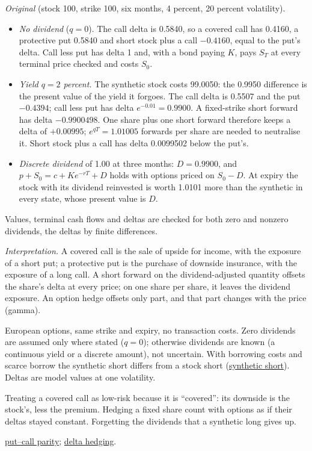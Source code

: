 \begin{qfmethod}
 \emph{Original} (stock 100, strike 100, six months, 4 percent, 20 percent volatility).
\begin{itemize}
\item \emph{No dividend} ($q=0$). The call delta is 0.5840, so a covered call has 0.4160, a protective put 0.5840 and short stock plus a call $-0.4160$, equal to the put's delta. Call less put has delta 1 and, with a bond paying $K$, pays $S_T$ at every terminal price checked and costs $S_0$.
\item \emph{Yield $q=2$ percent.} The synthetic stock costs 99.0050: the 0.9950 difference is the present value of the yield it forgoes. The call delta is 0.5507 and the put $-0.4394$; call less put has delta $e^{-0.01}=0.9900$. A fixed-strike short forward has delta $-0.9900498$. One share plus one short forward therefore keeps a delta of $+0.00995$; $e^{qT}=1.01005$ forwards per share are needed to neutralise it. Short stock plus a call has delta 0.0099502 below the put's.
\item \emph{Discrete dividend} of 1.00 at three months: $D=0.9900$, and $p+S_0=c+Ke^{-rT}+D$ holds with options priced on $S_0-D$. At expiry the stock with its dividend reinvested is worth 1.0101 more than the synthetic in every state, whose present value is $D$.
\end{itemize}
Values, terminal cash flows and deltas are checked for both zero and nonzero dividends, the deltas by finite differences.

\emph{Interpretation.} A covered call is the sale of upside for income, with the exposure of a short put; a protective put is the purchase of downside insurance, with the exposure of a long call. A short forward on the dividend-adjusted quantity offsets the share's delta at every price; on one share per share, it leaves the dividend exposure. An option hedge offsets only part, and that part changes with the price (gamma).

 European options, same strike and expiry, no transaction costs. Zero dividends are assumed only where stated ($q=0$); otherwise dividends are known (a continuous yield or a discrete amount), not uncertain. With borrowing costs and scarce borrow the synthetic short differs from a stock short (\hyperref[res:synthetic-short-put-call]{synthetic short}). Deltas are model values at one volatility.

 Treating a covered call as low-risk because it is ``covered'': its downside is the stock's, less the premium. Hedging a fixed share count with options as if their deltas stayed constant. Forgetting the dividends that a synthetic long gives up.

 \hyperref[res:put-call-forward-parity]{put--call parity}; \hyperref[meth:greeks-delta-gamma-hedging]{delta hedging}.

\end{qfmethod}

